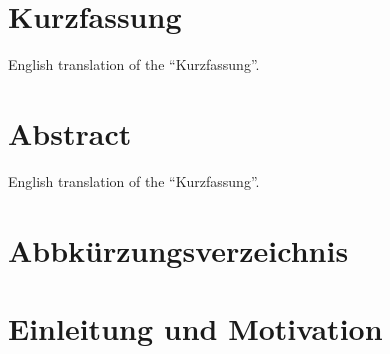 \documentclass[a4paper, 12pt]{article} %
\begin{document}
\rmfamily

\clearpage

\section*{Kurzfassung}
\begin{spacing}{1.8}  %
    \fontsize{14pt}{15pt}\selectfont  %
English translation of the “Kurzfassung”.

\end{spacing}

\clearpage
\section*{Abstract}
\begin{spacing}{1.8}  %
    \fontsize{14pt}{15pt}\selectfont  %
English translation of the “Kurzfassung”.

\end{spacing}
\clearpage

\listoffigures

\clearpage

\section*{Abbkürzungsverzeichnis}
\begin{spacing}{1.8}  %
    \fontsize{14pt}{15pt}\selectfont  %



\end{spacing}

\clearpage


\tableofcontents

\clearpage
{}


\section{Einleitung und Motivation}
\begin{spacing}{1.5}  %
\fontsize{14pt}{14pt}\selectfont  %

\end{spacing}
\end{document}
